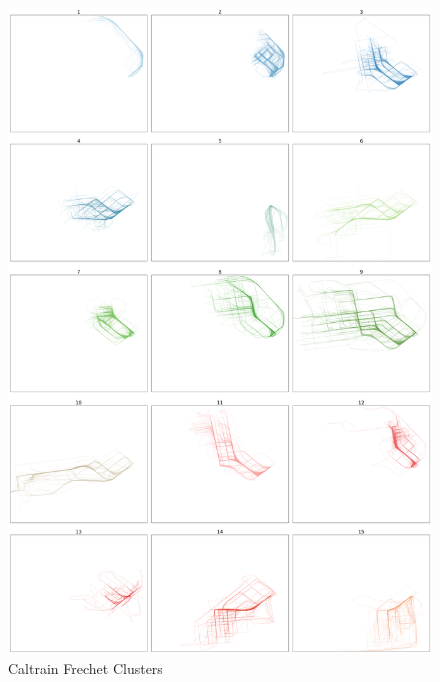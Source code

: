 \documentclass[a4paper, 12pt]{article}
\begin{document}
\begin{figure}[htbp!]
    \centering
    \includegraphics[width=1\textwidth]{Caltrain Frechet.png}
    \caption{Caltrain Frechet Clusters}
    \label{fig43}
\end{figure}
\end{document}
